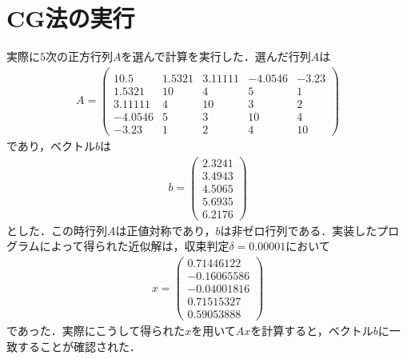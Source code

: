 \documentclass[a4j]{jarticle}
\begin{document}
\section{CG法の実行}
実際に$5$次の正方行列$A$を選んで計算を実行した．選んだ行列$A$は
\begin{align*}
 A=\begin{pmatrix}\\
10.5&1.5321&3.11111&-4.0546&-3.23\\
           1.5321&10&4&5&1\\
           3.11111&4&10&3&2\\
           -4.0546&5&3&10&4\\
           -3.23&1&2&4&10
   \end{pmatrix}
\end{align*}
であり，ベクトル$b$は
\begin{align*}
 b=
\begin{pmatrix}
2.3241\\
3.4943\\
4.5065\\
5.6935\\
6.2176
\end{pmatrix}
\end{align*}
とした．この時行列$A$は正値対称であり，$b$は非ゼロ行列である．実装したプログラムによって得られた近似解は，収束判定$\delta=0.00001$において
\begin{align*}
x= 
\begin{pmatrix}
 0.71446122\\
 -0.16065586\\
 -0.04001816\\
  0.71515327\\
  0.59053888
 \end{pmatrix}
\end{align*}
であった．実際にこうして得られた$x$を用いて$Ax$を計算すると，ベクトル$b$に一致することが確認された．
\end{document}
